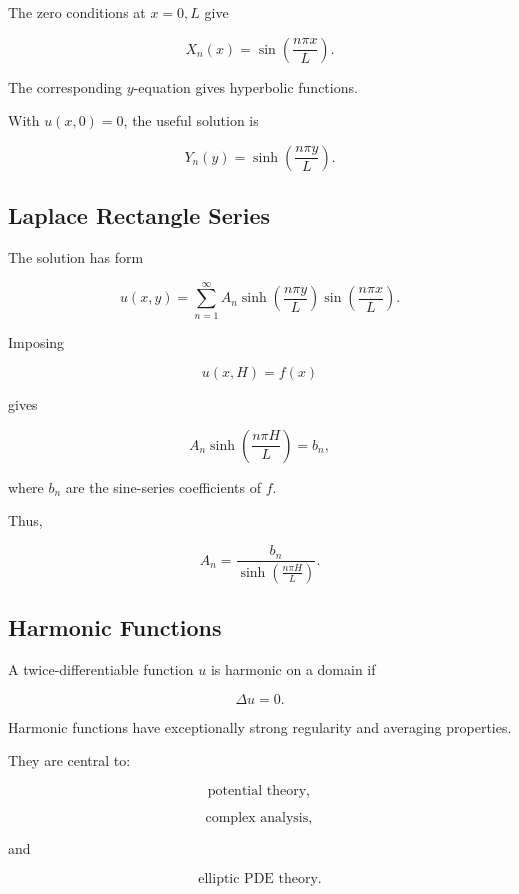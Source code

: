 The zero conditions at \(x=0,L\) give

\[
\boxed{
X_n(x)
=
\sin
\left(
\frac{n\pi x}{L}
\right).
}
\]

The corresponding \(y\)-equation gives hyperbolic functions.

With \(u(x,0)=0\), the useful solution is

\[
\boxed{
Y_n(y)
=
\sinh
\left(
\frac{n\pi y}{L}
\right).
}
\]

\subsection{Laplace Rectangle Series}
\label{subsec:laplace-rectangle-series}

The solution has form

\[
\boxed{
u(x,y)
=
\sum_{n=1}^{\infty}
A_n
\sinh
\left(
\frac{n\pi y}{L}
\right)
\sin
\left(
\frac{n\pi x}{L}
\right).
}
\]

Imposing

\[
u(x,H)=f(x)
\]

gives

\[
A_n
\sinh
\left(
\frac{n\pi H}{L}
\right)
=
b_n,
\]

where \(b_n\) are the sine-series coefficients of \(f\).

Thus,

\[
\boxed{
A_n
=
\frac{
b_n
}{
\sinh
\left(
\frac{n\pi H}{L}
\right)
}.
}
\]

\subsection{Harmonic Functions}
\label{subsec:harmonic-functions}

A twice-differentiable function \(u\) is harmonic on a domain if

\[
\boxed{
\Delta u=0.
}
\]

Harmonic functions have exceptionally strong regularity and averaging
properties.

They are central to:

\[
\boxed{
\text{potential theory},
}
\]

\[
\boxed{
\text{complex analysis},
}
\]

and

\[
\boxed{
\text{elliptic PDE theory}.
}
\]

